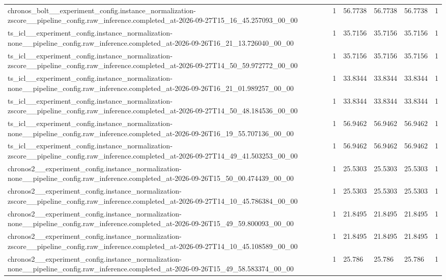\begin{tabular}{llllll}
chronos\_bolt\_\_experiment\_config.instance\_normalization-zscore\_\_pipeline\_config.raw\_inference.completed\_at-2026-09-27T15\_16\_45.257093\_00\_00 & 1 & 56.7738 & 56.7738 & 56.7738 & 1 \\
ts\_icl\_\_experiment\_config.instance\_normalization-none\_\_pipeline\_config.raw\_inference.completed\_at-2026-09-26T16\_21\_13.726040\_00\_00 & 1 & 35.7156 & 35.7156 & 35.7156 & 1 \\
ts\_icl\_\_experiment\_config.instance\_normalization-zscore\_\_pipeline\_config.raw\_inference.completed\_at-2026-09-27T14\_50\_59.972772\_00\_00 & 1 & 35.7156 & 35.7156 & 35.7156 & 1 \\
ts\_icl\_\_experiment\_config.instance\_normalization-none\_\_pipeline\_config.raw\_inference.completed\_at-2026-09-26T16\_21\_01.989257\_00\_00 & 1 & 33.8344 & 33.8344 & 33.8344 & 1 \\
ts\_icl\_\_experiment\_config.instance\_normalization-zscore\_\_pipeline\_config.raw\_inference.completed\_at-2026-09-27T14\_50\_48.184536\_00\_00 & 1 & 33.8344 & 33.8344 & 33.8344 & 1 \\
ts\_icl\_\_experiment\_config.instance\_normalization-none\_\_pipeline\_config.raw\_inference.completed\_at-2026-09-26T16\_19\_55.707136\_00\_00 & 1 & 56.9462 & 56.9462 & 56.9462 & 1 \\
ts\_icl\_\_experiment\_config.instance\_normalization-zscore\_\_pipeline\_config.raw\_inference.completed\_at-2026-09-27T14\_49\_41.503253\_00\_00 & 1 & 56.9462 & 56.9462 & 56.9462 & 1 \\
chronos2\_\_experiment\_config.instance\_normalization-none\_\_pipeline\_config.raw\_inference.completed\_at-2026-09-26T15\_50\_00.474439\_00\_00 & 1 & 25.5303 & 25.5303 & 25.5303 & 1 \\
chronos2\_\_experiment\_config.instance\_normalization-zscore\_\_pipeline\_config.raw\_inference.completed\_at-2026-09-27T14\_10\_45.786384\_00\_00 & 1 & 25.5303 & 25.5303 & 25.5303 & 1 \\
chronos2\_\_experiment\_config.instance\_normalization-none\_\_pipeline\_config.raw\_inference.completed\_at-2026-09-26T15\_49\_59.800093\_00\_00 & 1 & 21.8495 & 21.8495 & 21.8495 & 1 \\
chronos2\_\_experiment\_config.instance\_normalization-zscore\_\_pipeline\_config.raw\_inference.completed\_at-2026-09-27T14\_10\_45.108589\_00\_00 & 1 & 21.8495 & 21.8495 & 21.8495 & 1 \\
chronos2\_\_experiment\_config.instance\_normalization-none\_\_pipeline\_config.raw\_inference.completed\_at-2026-09-26T15\_49\_58.583374\_00\_00 & 1 & 25.786 & 25.786 & 25.786 & 1 \\

\end{tabular}
